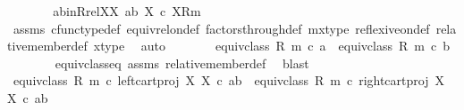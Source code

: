 \begin{isabellebody}
\ \ \ \ \isamarkupfalse%
\ \isamarkupfalse%
\ ab{\isacharunderscore}{\kern0pt}inR{\isacharunderscore}{\kern0pt}relXX{\isacharcolon}{\kern0pt}\ {\isachardoublequoteopen}{\isasymlangle}a{\isacharcomma}{\kern0pt}b{\isasymrangle}\ {\isasymin}\isactrlbsub X\ {\isasymtimes}\isactrlsub c\ X\isactrlesub {\isacharparenleft}{\kern0pt}R{\isacharcomma}{\kern0pt}m{\isacharparenright}{\kern0pt}{\isachardoublequoteclose}\isanewline
\ \ \ \ \ \ \isamarkupfalse%
\ assms\ cfunc{\isacharunderscore}{\kern0pt}type{\isacharunderscore}{\kern0pt}def\ equiv{\isacharunderscore}{\kern0pt}rel{\isacharunderscore}{\kern0pt}on{\isacharunderscore}{\kern0pt}def\ factors{\isacharunderscore}{\kern0pt}through{\isacharunderscore}{\kern0pt}def\ m{\isacharunderscore}{\kern0pt}x{\isacharunderscore}{\kern0pt}type\ reflexive{\isacharunderscore}{\kern0pt}on{\isacharunderscore}{\kern0pt}def\ relative{\isacharunderscore}{\kern0pt}member{\isacharunderscore}{\kern0pt}def{}\ x{\isacharunderscore}{\kern0pt}type\ \isamarkupfalse%
\ auto\isanewline
\ \ \ \ \isamarkupfalse%
\ \isamarkupfalse%
\ {\isachardoublequoteopen}equiv{\isacharunderscore}{\kern0pt}class\ {\isacharparenleft}{\kern0pt}R{\isacharcomma}{\kern0pt}\ m{\isacharparenright}{\kern0pt}\ {\isasymcirc}\isactrlsub c\ a\ {\isacharequal}{\kern0pt}\ equiv{\isacharunderscore}{\kern0pt}class\ {\isacharparenleft}{\kern0pt}R{\isacharcomma}{\kern0pt}\ m{\isacharparenright}{\kern0pt}\ {\isasymcirc}\isactrlsub c\ b{\isachardoublequoteclose}\isanewline
\ \ \ \ \ \ \isamarkupfalse%
\ equiv{\isacharunderscore}{\kern0pt}class{\isacharunderscore}{\kern0pt}eq\ assms\ relative{\isacharunderscore}{\kern0pt}member{\isacharunderscore}{\kern0pt}def\ \isamarkupfalse%
\ blast\isanewline
\ \ \ \ \isamarkupfalse%
\ \isamarkupfalse%
\ {\isachardoublequoteopen}equiv{\isacharunderscore}{\kern0pt}class\ {\isacharparenleft}{\kern0pt}R{\isacharcomma}{\kern0pt}\ m{\isacharparenright}{\kern0pt}\ {\isasymcirc}\isactrlsub c\ left{\isacharunderscore}{\kern0pt}cart{\isacharunderscore}{\kern0pt}proj\ X\ X\ {\isasymcirc}\isactrlsub c\ {\isasymlangle}a{\isacharcomma}{\kern0pt}b{\isasymrangle}\ {\isacharequal}{\kern0pt}\ equiv{\isacharunderscore}{\kern0pt}class\ {\isacharparenleft}{\kern0pt}R{\isacharcomma}{\kern0pt}\ m{\isacharparenright}{\kern0pt}\ {\isasymcirc}\isactrlsub c\ right{\isacharunderscore}{\kern0pt}cart{\isacharunderscore}{\kern0pt}proj\ X\ X\ {\isasymcirc}\isactrlsub c\ {\isasymlangle}a{\isacharcomma}{\kern0pt}b{\isasymrangle}{\isachardoublequoteclose}\isanewline

\end{isabellebody}
